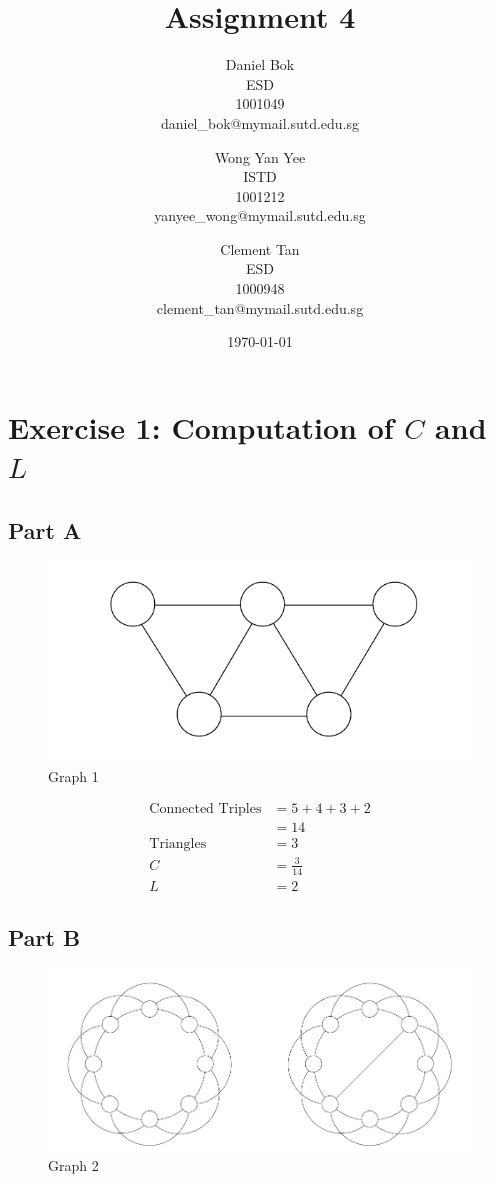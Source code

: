 \documentclass[]{article}
\title{Assignment 4}
\author{
	Daniel Bok \\
	ESD \\
	1001049 \\
	daniel\_bok@mymail.sutd.edu.sg 
	\and
	Wong Yan Yee\\ 
	ISTD \\
	1001212 \\
	yanyee\_wong@mymail.sutd.edu.sg
	\and
	Clement Tan \\
	ESD \\
	1000948 \\
	clement\_tan@mymail.sutd.edu.sg
}
\date{\today}
\newcommand{\e}{&=}
\begin{document}
	
\maketitle

\newpage
\section*{Exercise 1: Computation of $C$ and $L$}

\subsection*{Part A}
\begin{figure}[H]
	\centering
	\includegraphics[width=\linewidth]{Graph-1.png}
	\caption{Graph 1}
	\label{fig:graph-1}
\end{figure}

\begin{align*}
\text{Connected Triples} \e 5 + 4 + 3 + 2 \\
	\e 14 \\
\text{Triangles} \e 3 \\
C \e \frac{3}{14} \\
L \e 2
\end{align*}

\subsection*{Part B}
\begin{figure}[H]
	\centering
	\includegraphics[width=\linewidth]{Graph-2.png}
	\caption{Graph 2}
	\label{fig:graph-2}
\end{figure}
\end{document}

